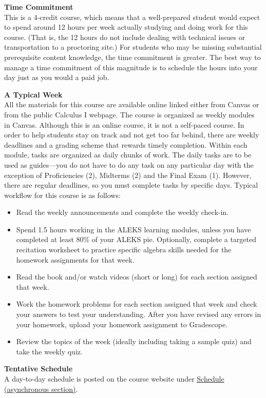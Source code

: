 \documentclass[12pt]{article}
\renewcommand{\emph}[1]{\textsf{\textbf{#1}}}
\newcommand{\localhead}[1]{\par\smallskip\textbf{#1}\nobreak\\}%
\def\heading#1{\localhead{\large\emph{#1}}}
\begin{document}
\heading{Time Commitment}
This is a 4-credit course, which means that a well-prepared student would expect to spend around 12
hours per week actually studying and doing work for this course. (That is, the 12 hours do not include dealing with
technical issues or transportation to a proctoring site.) For students who may be missing substantial
prerequisite content knowledge, the time commitment is greater. The best way to manage a time
commitment of this magnitude is to schedule the hours into your day just as you would a paid job.

\heading{A Typical Week}
All the materials for this course are available online linked either from Canvas or from the public Calculus I webpage. The course is organized as weekly modules in Canvas. Although this is
an online course, it is not a self-paced course. In order to help students stay on track and not get too far behind, there are weekly
deadlines and a grading scheme that rewards timely completion. Within each module, tasks are
organized as daily chunks of work. The daily tasks are to be used as guides---you do not have
to do any task on any particular day with the exception of Proficiencies (2), Midterms (2) and the
Final Exam (1). However, there are regular deadlines, so you must complete tasks by specific days.
Typical workflow for this course is as follows: 
\begin{itemize}
\item Read the weekly announcements and complete the weekly check-in.
\item Spend 1.5 hours working in the ALEKS learning modules, unless you have completed at least 80\% of your ALEKS pie. Optionally, complete a targeted recitation worksheet to practice specific algebra skills needed for the homework assignments for that week.
\item Read the book and/or watch videos (short or long) for each section assigned that week.
\item Work the homework problems for each section assigned that week and check your answers to test your understanding. After you have revised any errors in your homework, upload your homework assignment to Gradescope.
\item Review the topics of the week (ideally including taking a sample quiz) and take the weekly quiz.
\end{itemize}

\heading{Tentative Schedule}
A day-to-day schedule is posted on the course website under
\href{https://docs.google.com/spreadsheets/d/e/2PACX-1vR1jQfLj4vqM_JdgqI6GEhBx_6KHwRRfvfHLL7oCHY_V_xKlNOvP3x7bOT8jx1f6Ge6sDfKTi4mMOQ1/pubhtml}{Schedule (asynchronous section)}. 
\end{document}

